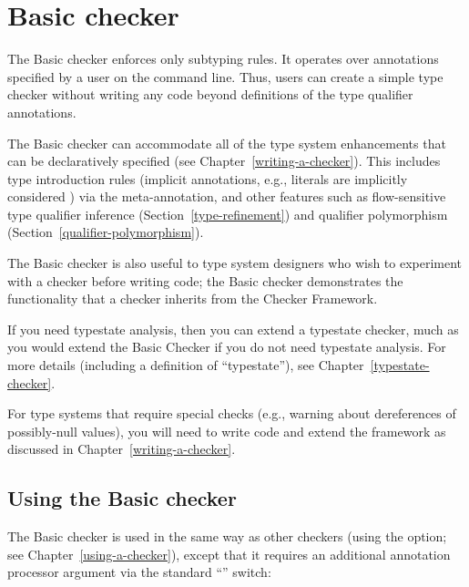 \htmlhr
\chapter{Basic checker\label{basic-checker}}

The Basic checker enforces only subtyping rules.  It operates over
annotations specified by a user on the command line.  Thus, users can
create a simple type checker without writing any code beyond definitions of
the type qualifier annotations.

The Basic checker can accommodate all of the type system enhancements that
can be declaratively specified (see Chapter~\ref{writing-a-checker}).
This includes type introduction rules (implicit
annotations, e.g., literals are implicitly considered ) via
the  meta-annotation, and other features such as
flow-sensitive type qualifier inference (Section~\ref{type-refinement}) and
qualifier polymorphism (Section~\ref{qualifier-polymorphism}).

The Basic checker is also useful to type system designers who wish to
experiment with a checker before writing code; the Basic checker
demonstrates the functionality that a checker inherits from the Checker
Framework.

If you need typestate analysis, then you can extend a typestate checker,
much as you would extend the Basic Checker if you do not need typestate
analysis.  For more details (including a definition of ``typestate''), see
Chapter~\ref{typestate-checker}.

For type systems that require special checks (e.g., warning about
dereferences of possibly-null values), you will need to write code and
extend the framework as discussed in Chapter~\ref{writing-a-checker}.


\section{Using the Basic checker\label{basic-using}}

The Basic checker is used in the same way as other checkers (using the
 option; see Chapter~\ref{using-a-checker}), except that it
requires an additional annotation processor argument via the standard
``'' switch:

